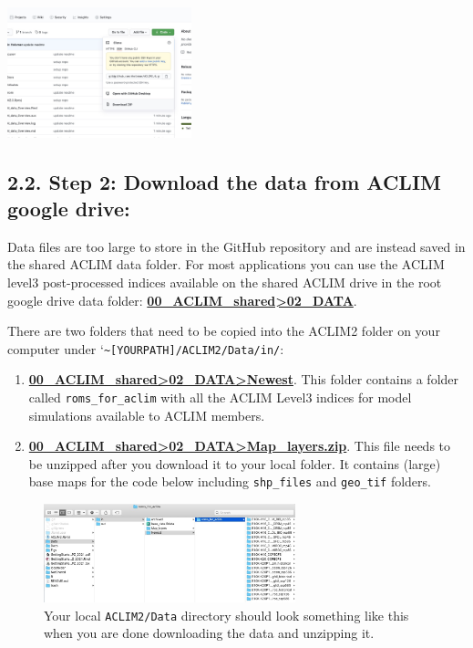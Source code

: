 \documentclass[
]{article}
\begin{document}
\includegraphics[width=0.4\textwidth,height=\textheight]{Figs/clone.jpg}

\hypertarget{step-2-download-the-data-from-aclim-google-drive}{%
\subsection{2.2. Step 2: Download the data from ACLIM google
drive:}\label{step-2-download-the-data-from-aclim-google-drive}}

Data files are too large to store in the GitHub repository and are
instead saved in the shared ACLIM data folder. For most applications you
can use the ACLIM level3 post-processed indices available on the shared
ACLIM drive in the root google drive data folder:
\href{https://drive.google.com/drive/u/0/folders/0Bx7wdZllbuF9eDJndkhCS2EwQUk}{\textbf{00\_ACLIM\_shared\textgreater02\_DATA}}.

There are two folders that need to be copied into the ACLIM2 folder on
your computer under
`\texttt{\textasciitilde{}{[}YOURPATH{]}/ACLIM2/Data/in/}:

\begin{enumerate}
\def\labelenumi{\arabic{enumi})}
\item
  \href{https://drive.google.com/drive/u/0/folders/0Bx7wdZllbuF9eDJndkhCS2EwQUk}{\textbf{00\_ACLIM\_shared\textgreater02\_DATA\textgreater Newest}}.
  This folder contains a folder called \texttt{roms\_for\_aclim} with
  all the ACLIM Level3 indices for model simulations available to ACLIM
  members.
\item
  \href{https://drive.google.com/drive/u/0/folders/0Bx7wdZllbuF9eDJndkhCS2EwQUk}{\textbf{00\_ACLIM\_shared\textgreater02\_DATA\textgreater Map\_layers.zip}}.
  This file needs to be unzipped after you download it to your local
  folder. It contains (large) base maps for the code below including
  \texttt{shp\_files} and \texttt{geo\_tif} folders.
\end{enumerate}

\begin{figure}
\centering
\includegraphics[width=0.65\textwidth,height=\textheight]{Figs/data_dir.jpg}
\caption{Your local \texttt{ACLIM2/Data} directory should look something
like this when you are done downloading the data and unzipping it.}
\end{figure}
\end{document}
